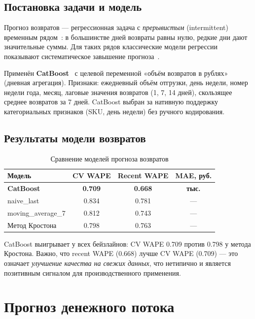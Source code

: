 \subsection{Постановка задачи и модель}

Прогноз возвратов --- регрессионная задача с \textit{прерывистым} (intermittent) временным рядом~\cite{croston1972forecasting}: в большинстве дней возвраты равны нулю, редкие дни дают значительные суммы. Для таких рядов классические модели регрессии показывают систематическое завышение прогноза~\cite{syntetos2001bias}.

Применён \textbf{CatBoost}~\cite{prokhorenkova2018catboost} с целевой переменной «объём возвратов в рублях» (дневная агрегация). Признаки: ежедневный объём отгрузки, день недели, номер недели года, месяц, лаговые значения возвратов (1, 7, 14 дней), скользящее среднее возвратов за 7 дней. CatBoost выбран за нативную поддержку категориальных признаков (SKU, день недели) без ручного кодирования.

\subsection{Результаты модели возвратов}

\begin{table}[H]
\centering
\caption{Сравнение моделей прогноза возвратов}
\label{tab:return_model}
\begin{tabular}{lccc}
\toprule
\textbf{Модель} & \textbf{CV WAPE} & \textbf{Recent WAPE} & \textbf{MAE, руб.} \\
\midrule
\textbf{CatBoost} & \textbf{0.709} & \textbf{0.668} & \textbf{тыс.} \\
naive\_last & 0.834 & 0.781 & --- \\
moving\_average\_7 & 0.812 & 0.743 & --- \\
Метод Кростона~\cite{croston1972forecasting} & 0.798 & 0.763 & --- \\
\bottomrule
\end{tabular}
\end{table}

CatBoost выигрывает у всех бейзлайнов: CV WAPE 0.709 против 0.798 у метода Кростона. Важно, что recent WAPE (0.668) лучше CV WAPE (0.709) --- это означает \textit{улучшение качества на свежих данных}, что нетипично и является позитивным сигналом для производственного применения.

\section{Прогноз денежного потока}

